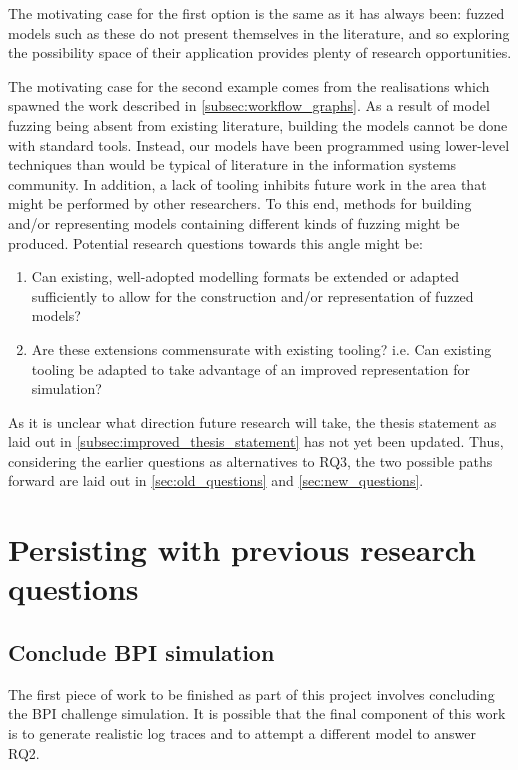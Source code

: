 \documentclass[11pt]{article}
\begin{document}
The motivating case for the first option is the same as it has always been:
fuzzed models such as these do not present themselves in the literature, and so
exploring the possibility space of their application provides plenty of research
opportunities. 

The motivating case for the second example comes from the realisations which
spawned the work described in \cref{subsec:workflow_graphs}. As a result of
model fuzzing being absent from existing literature, building the models cannot
be done with standard tools. Instead, our models have been
programmed using lower-level techniques than would be typical of literature in
the information systems community. In addition, a lack of tooling inhibits
future work in the area that might be performed by other researchers. To this
end, methods for building and/or representing models containing different kinds
of fuzzing might be produced. Potential research questions towards this angle
might be:

\begin{enumerate}
\item Can existing, well-adopted modelling formats be extended or adapted
sufficiently to allow for the construction and/or representation of fuzzed
models?
\item Are these extensions commensurate with existing tooling? i.e. Can existing
tooling be adapted to take advantage of an improved representation for simulation?
\end{enumerate}

As it is unclear what direction future research will take, the thesis statement
as laid out in \cref{subsec:improved_thesis_statement} has not yet been updated.
Thus, considering the earlier questions as alternatives to RQ3, the two possible
paths forward are laid out in \cref{sec:old_questions} and \cref{sec:new_questions}.

\section{Persisting with previous research questions}
\label{sec:orgf4075be}
\label{sec:old_questions}

\subsection{Conclude BPI simulation}
\label{sec:org9fdebc6}
The first piece of work to be finished as part of this project involves
concluding the BPI challenge simulation. It is possible that the final component
of this work is to generate realistic log traces and to attempt a different
model to answer RQ2.
\end{document}

